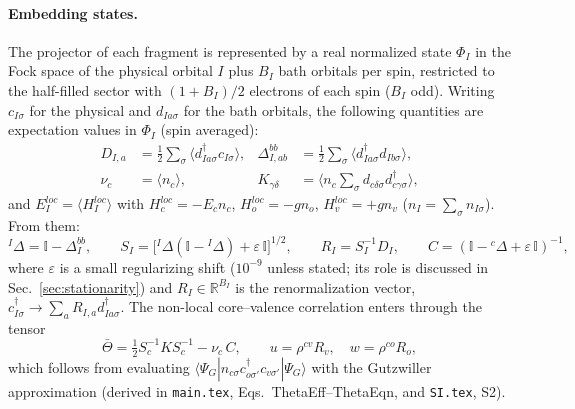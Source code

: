 \documentclass[11pt]{article}
\newcommand{\dg}{^{\dagger}}
\newcommand{\braket}[1]{\langle #1\rangle}
\begin{document}
\paragraph{Embedding states.} The projector of each fragment is represented by a real normalized state $\Phi_I$ in the
Fock space of the physical orbital $I$ plus $B_I$ bath orbitals per spin, restricted to the half-filled sector with
$(1+B_I)/2$ electrons of each spin ($B_I$ odd). Writing $c_{I\sigma}$ for the physical and $d_{Ia\sigma}$ for the bath orbitals, the
following quantities are expectation values in $\Phi_I$ (spin averaged):
\begin{equation}
\begin{aligned}
D_{I,a}&=\tfrac12\sum_\sigma\braket{d\dg_{Ia\sigma}c_{I\sigma}}, &
\Delta^{bb}_{I,ab}&=\tfrac12\sum_\sigma\braket{d\dg_{Ia\sigma}d_{Ib\sigma}},\\
\nu_c&=\braket{n_c}, &
K_{\gamma\delta}&=\Big\langle n_c\sum_\sigma d_{c\delta\sigma}d\dg_{c\gamma\sigma}\Big\rangle,
\end{aligned}
\end{equation}
and $E^{loc}_I=\braket{H^{loc}_I}$ with $H^{loc}_c=-E_cn_c$, $H^{loc}_o=-g n_o$, $H^{loc}_v=+g n_v$
($n_I=\sum_\sigma n_{I\sigma}$). From them:
\begin{equation}
{}^I\Delta=\mathbb I-\Delta^{bb}_I,\qquad S_I=\big[{}^I\Delta(\mathbb I-{}^I\Delta)+\varepsilon\,\mathbb I\big]^{1/2},\qquad
R_I=S_I^{-1}D_I,\qquad C=(\mathbb I-{}^c\Delta+\varepsilon\,\mathbb I)^{-1},
\end{equation}
where $\varepsilon$ is a small regularizing shift ($10^{-9}$ unless stated; its role is discussed in Sec.~\ref{sec:stationarity}) and $R_I\in\mathbb R^{B_I}$ is the renormalization vector,
$c\dg_{I\sigma}\to\sum_aR_{I,a}d\dg_{Ia\sigma}$. The non-local core--valence correlation enters through the tensor
\begin{equation}
\bar\Theta=\tfrac12S_c^{-1}KS_c^{-1}-\nu_c\,C,\qquad u=\rho^{cv}R_v,\quad w=\rho^{co}R_o,
\end{equation}
which follows from evaluating $\braket{\Psi_G|n_{c\sigma}c\dg_{o\sigma'}c_{v\sigma'}|\Psi_G}$ with the Gutzwiller approximation
(derived in \texttt{main.tex}, Eqs.~ThetaEff--ThetaEqn, and \texttt{SI.tex}, S2).
\end{document}
